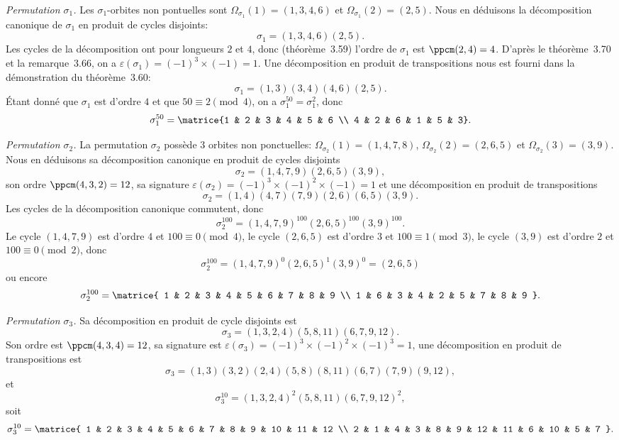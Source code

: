 \textit{Permutation $\sigma_1$.}
Les $\sigma_1$-orbites non pontuelles sont $\Omega_{\sigma_1}(1)=(1,3,4,6)$ et $\Omega_{\sigma_1}(2)=(2,5)$.
Nous en déduisons la décomposition canonique de $\sigma_1$ en produit de cycles disjoints:
\[
  \sigma_1 = (1,3,4,6)(2,5).
\]
Les cycles de la décomposition ont pour longueurs $2$ et $4$, donc (théorème~3.59) l'ordre de $\sigma_1$ est $\ppcm(2,4)=4$.
D'après le théorème~3.70 et la remarque~3.66, on a $\varepsilon(\sigma_1) = (-1)^3\times (-1) = 1$.
Une décomposition en produit de transpositions nous est fourni dans la démonstration du théorème~3.60:
\[
  \sigma_1 = (1,3)(3,4)(4,6)(2,5).
\]
Étant donné que $\sigma_1$ est d'ordre $4$ et que $50 \equiv 2 \pmod{4}$, on a $\sigma_1^{50} = \sigma_1^2$, donc
\[
  \sigma_1^{50} = \matrice{1 & 2 & 3 & 4 & 5 & 6 \\ 4 & 2 & 6 & 1 & 5 & 3}.
\]

\textit{Permutation $\sigma_2$.}
La permutation $\sigma_2$ possède $3$ orbites non ponctuelles: $\Omega_{\sigma_2}(1) = (1,4,7,8)$, $\Omega_{\sigma_2}(2) = (2,6,5)$ et $\Omega_{\sigma_2}(3) = (3,9)$.
Nous en déduisons sa décomposition canonique en produit de cycles disjoints
\[
  \sigma_2 = (1,4,7,9)(2,6,5)(3,9),
\]
son ordre $\ppcm(4,3,2) = 12$, sa signature $\varepsilon(\sigma_2) = (-1)^3\times(-1)^2\times(-1) = 1$ et une décomposition en produit de transpositions
\[
  \sigma_2 = (1,4)(4,7)(7,9)(2,6)(6,5)(3,9).
\]
Les cycles de la décomposition canonique commutent, donc
\[
  \sigma_2^{100} = (1,4,7,9)^{100} (2,6,5)^{100} (3,9)^{100}.
\]
Le cycle $(1,4,7,9)$ est d'ordre $4$ et $100\equiv 0 \pmod{4}$, le cycle $(2,6,5)$ est d'ordre $3$ et $100\equiv 1\pmod{3}$, le cycle $(3,9)$ est d'ordre $2$ et $100\equiv 0\pmod{2}$, donc
\[
  \sigma_2^{100} = (1,4,7,9)^0 (2,6,5)^1 (3,9)^0 = (2,6,5)
\]
ou encore
\[
  \sigma_2^{100}
  = \matrice{
      1 & 2 & 3 & 4 & 5 & 6 & 7 & 8 & 9 \\
      1 & 6 & 3 & 4 & 2 & 5 & 7 & 8 & 9
  }.
\]

\textit{Permutation $\sigma_3$.}
Sa décomposition en produit de cycle disjoints est
\[
  \sigma_3 = (1,3,2,4)(5,8,11)(6,7,9,12).
\]
Son ordre est $\ppcm(4,3,4) = 12$, sa signature est $\varepsilon(\sigma_3) = (-1)^3\times (-1)^2 \times (-1)^3 = 1$, une décomposition en produit de transpositions est
\[
  \sigma_3 = (1,3)(3,2)(2,4)(5,8)(8,11)(6,7)(7,9)(9,12),
\]
et
\[
  \sigma_3^{10} = (1,3,2,4)^2 (5,8,11) (6,7,9,12)^2,
\]
soit
\[
  \sigma_3^{10}
    = \matrice{
         1 & 2 & 3 & 4 & 5 & 6 &  7 &  8 & 9 & 10 & 11 & 12 \\
         2 & 1 & 4 & 3 & 8 & 9 & 12 & 11 & 6 & 10 &  5 &  7
    }.
\]
